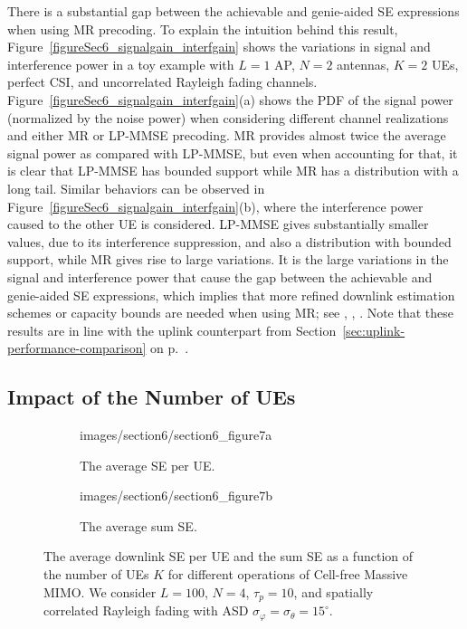 There is a substantial gap between the achievable and genie-aided SE expressions when using MR precoding. To explain the intuition behind this result, Figure~\ref{figureSec6_signalgain_interfgain} shows the variations in signal and interference power in a toy example with $L=1$ AP, $N=2$ antennas, $K=2$ UEs, perfect CSI, and uncorrelated Rayleigh fading channels. Figure~\ref{figureSec6_signalgain_interfgain}(a) shows the PDF of the signal power (normalized by the noise power) when considering different channel realizations and either MR or LP-MMSE precoding. MR provides almost twice the average signal power as compared with LP-MMSE, but even when accounting for that, it is clear that LP-MMSE has bounded support while MR has a distribution with a long tail. Similar behaviors can be observed in Figure~\ref{figureSec6_signalgain_interfgain}(b), where the interference power caused to the other UE is considered. LP-MMSE gives substantially smaller values, due to its interference suppression, and also a distribution with bounded support, while MR gives rise to large variations. 
It is the large variations in the signal and interference power that cause the gap between the achievable and genie-aided SE expressions, which implies that more refined downlink estimation schemes or capacity bounds are needed when using MR; see \cite{Caire2017a}, \cite{Chen2018b}, \cite{Interdonato2019b}. Note that these results are in line with the uplink counterpart from Section~\ref{sec:uplink-performance-comparison} on p.~\pageref{sec:uplink-performance-comparison}.



\subsection{Impact of the Number of UEs}


\begin{figure}[p!]
	\begin{subfigure}[b]{\columnwidth} \centering 
		\begin{overpic}[width=0.88\columnwidth,tics=10]{images/section6/section6_figure7a}
		\end{overpic} \label{figureSec6_4a}
		\caption{The average SE per UE.} 
		\vspace{4mm}
	\end{subfigure} 
	\begin{subfigure}[b]{\columnwidth} \centering 
		\begin{overpic}[width=0.88\columnwidth,tics=10]{images/section6/section6_figure7b}
		\end{overpic} \label{figureSec6_4b}
		\caption{The average sum SE.} 
	\end{subfigure} 
	\caption{The average downlink SE per UE and the sum SE as a function of the number of UEs $K$ for different operations of Cell-free Massive MIMO. We consider $L=100$, $N=4$, $\tau_p=10$, and spatially correlated Rayleigh fading with ASD $\sigma_{\varphi}=\sigma_{\theta}=15^{\circ}$.}\label{figureSec6_4}
\end{figure}


